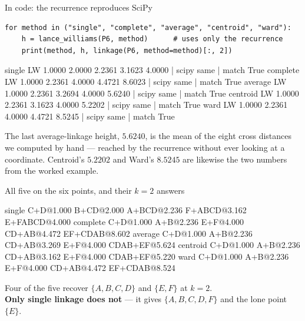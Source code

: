 \documentclass[aspectratio=169]{beamer}
\begin{document}
\begin{frame}[fragile,shrink=5]{In code: the recurrence reproduces SciPy}
\begin{lstlisting}[basicstyle=\ttfamily\scriptsize]
for method in ("single", "complete", "average", "centroid", "ward"):
    h = lance_williams(P6, method)      # uses only the recurrence
    print(method, h, linkage(P6, method=method)[:, 2])
\end{lstlisting}
\begin{outblk}
  single    LW 1.0000 2.0000 2.2361 3.1623 4.0000 | scipy same | match True
  complete  LW 1.0000 2.2361 4.0000 4.4721 8.6023 | scipy same | match True
  average   LW 1.0000 2.2361 3.2694 4.0000 5.6240 | scipy same | match True
  centroid  LW 1.0000 2.2361 3.1623 4.0000 5.2202 | scipy same | match True
  ward      LW 1.0000 2.2361 4.0000 4.4721 8.5245 | scipy same | match True
\end{outblk}
  \begin{center}\small
    The last average-linkage height, $\mathbf{5.6240}$, is the mean of the
    eight cross distances we computed by hand --- reached by the recurrence
    without ever looking at a coordinate. Centroid's $5.2202$ and Ward's
    $8.5245$ are likewise the two numbers from the worked example.
  \end{center}
\end{frame}

\begin{frame}[fragile]{All five on the six points, and their $k=2$ answers}
\begin{outblk}
  single    C+D@1.000  B+CD@2.000  A+BCD@2.236  F+ABCD@3.162  E+FABCD@4.000
  complete  C+D@1.000  A+B@2.236   E+F@4.000    CD+AB@4.472   EF+CDAB@8.602
  average   C+D@1.000  A+B@2.236   CD+AB@3.269  E+F@4.000     CDAB+EF@5.624
  centroid  C+D@1.000  A+B@2.236   CD+AB@3.162  E+F@4.000     CDAB+EF@5.220
  ward      C+D@1.000  A+B@2.236   E+F@4.000    CD+AB@4.472   EF+CDAB@8.524
\end{outblk}
  \vspace{0.3em}
  \begin{exampleblock}{}
    \centering
    Four of the five recover $\{A,B,C,D\}$ and $\{E,F\}$ at $k = 2$.\\
    \textbf{Only single linkage does not} --- it gives $\{A,B,C,D,F\}$ and the
    lone point $\{E\}$.
  \end{exampleblock}
\end{frame}

\end{document}
